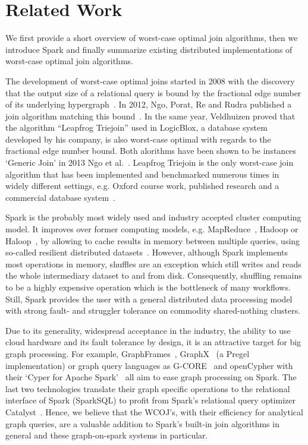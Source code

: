 \section{Related Work}
\label{sec:related-work}
We first provide a short overview of worst-case optimal join algorithms, then we introduce Spark and finally summarize existing distributed implementations of worst-case optimal join algorithms.

The development of worst-case optimal joins started in 2008 with the discovery that the output size of a relational query is bound by the fractional edge number of its underlying hypergraph~\cite{agm}. 
In 2012, Ngo, Porat, Re and Rudra published a join algorithm matching this bound~\cite{nprr}.
In the same year, Veldhuizen proved that the algorithm ``Leapfrog Triejoin'' used in LogicBlox, a database system developed by his company, is also worst-case optimal with regards to the
fractional edge number bound.
Both alorithms have been shown to be instances `Generic Join' in 2013 Ngo et al.~\cite{skew-strikes-back}.
Leapfrog Triejoin is the only worst-case join algorithm that has been implemented and benchmarked numerous times in widely different settings, e.g. Oxford course work, published research and a commercial database system~\cite{leapfrog,andreas,olddog,myria,ammar2018distributed,leapfrog-triejoin-schroeder}.

Spark is the probably most widely used and industry accepted cluster computing model. 
It improves over former computing models, e.g. MapReduce~\cite{mapreduce}, Hadoop or Haloop~\cite{haloop}, by allowing to cache results in memory between multiple queries, using so-called resilient distributed datasets~\cite{rdd}. %
However, although Spark implements most operations in memory, shuffles are an exception which still writes and reads the whole intermediary dataset to and from disk.
Consequently, shuffling remains to be a highly expensive operation which is the bottleneck of many workflows.
Still, Spark provides the user with a general distributed data processing model with strong fault- and struggler tolerance on commodity shared-nothing clusters.

Due to its generality, widespread acceptance in the industry, the ability to use cloud hardware and its fault tolerance by design, it is an attractive target for big graph processing.
For example, GraphFrames~\cite{graphframe}, GraphX~\cite{graphx} (a Pregel~\cite{pregel} implementation) or graph query languages as \mbox{G-CORE}~\cite{gcore} and \mbox{openCypher} with their `Cyper for Apache Spark'~\cite{caps} all aim to ease graph processing on Spark.
The last two technologies translate their graph specific operations to the relational interface of Spark (SparkSQL) to profit from Spark's relational query optimizer Catalyst~\cite{spark-sql}.
Hence, we believe that the WCOJ's, with their efficiency for analytical graph queries, are a valuable addition to Spark's built-in join algorithms in general and these graph-on-spark systems in particular.

